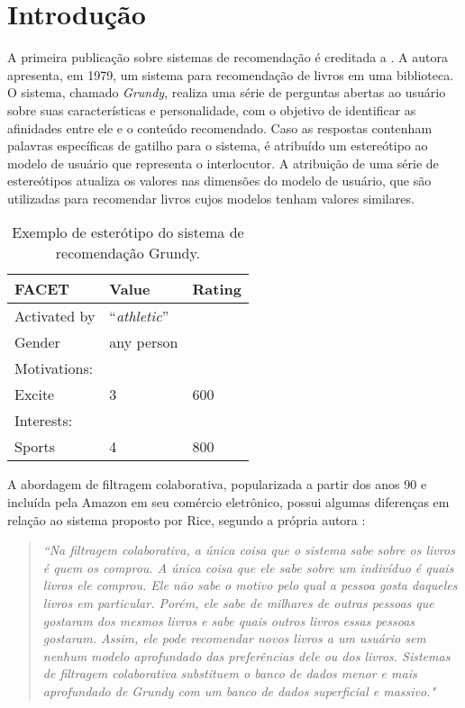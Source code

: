 \section{Introdução}

A primeira publicação sobre sistemas de recomendação é creditada a
\citet{rich1979user}. A autora apresenta, em 1979, um sistema para recomendação de livros
em uma biblioteca. O sistema, chamado \textit{Grundy}, realiza uma série de
perguntas abertas ao usuário sobre suas características e personalidade, com o objetivo
de identificar as afinidades entre ele e o conteúdo recomendado. Caso as
respostas contenham palavras específicas de gatilho para o sistema, é atribuído
um estereótipo ao modelo de usuário que representa o interlocutor. A atribuição
de uma série de estereótipos atualiza os valores nas dimensões do modelo de
usuário, que são utilizadas para recomendar livros cujos modelos tenham valores
similares.

\vspace{2em}

\begin{table}[h!]
\begin{center}
   \begin{tabular}{|m{3cm}|m{2cm}|m{2cm}|}
       \hline
       \textbf{FACET} & \textbf{Value} & \textbf{Rating} \\
       \hline
       Activated by & ``\textit{athletic}'' & \\
       Gender & any person & \\
       \hline
       Motivations: & & \\
       \hspace{1mm} Excite & 3 & 600 \\
       \hline
       Interests: & & \\
       \hspace{1mm} Sports & 4 & 800 \\
       \hline
   \end{tabular}
   \caption{Exemplo de esterótipo do sistema de recomendação Grundy.}
\end{center}
\end{table}

A abordagem de filtragem colaborativa, popularizada a partir dos anos 90 e
incluída pela Amazon \cite{amazon2017} em seu comércio eletrônico, possui
algumas diferenças em relação ao sistema proposto por Rice, segundo a própria
autora \cite{rich:homepage}:

\begin{quotation}\small\noindent \textit{``Na filtragem colaborativa, a única
   coisa que o sistema sabe sobre os livros é quem os comprou. A única coisa que
   ele sabe sobre um indivíduo é quais livros ele comprou. Ele não sabe o motivo
   pelo qual a pessoa gosta daqueles livros em particular. Porém, ele sabe de
   milhares de outras pessoas que gostaram dos mesmos livros e sabe quais outros
   livros essas pessoas gostaram. Assim, ele pode recomendar novos livros a um
   usuário sem nenhum modelo aprofundado das preferências dele ou dos livros.
   Sistemas de filtragem colaborativa substituem o banco de dados menor e mais
   aprofundado de Grundy com um banco de dados superficial e massivo."}
   \end{quotation}


